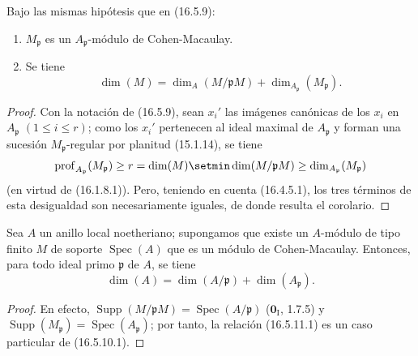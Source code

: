 \begin{corollary}[16.5.10]
\label{0.16.5.10-es}
Bajo las mismas hipótesis que en \textup{(16.5.9)}:
\begin{enumerate}
  \item[\textup{(i)}] $M_{\mathfrak{p}}$ es un $A_{\mathfrak{p}}$-módulo de
  Cohen-Macaulay.
  \item[\textup{(ii)}] Se tiene
  \begin{equation}
  \label{0.16.5.10.1-es}
  \tag{16.5.10.1}
    \dim(M)=\dim_A(M/\mathfrak{p}M)
    +\dim_{A_{\mathfrak{p}}}(M_{\mathfrak{p}}).
  \end{equation}
\end{enumerate}
\end{corollary}

\begin{proof}
Con la notación de (16.5.9), sean $x_i'$ las imágenes canónicas de los $x_i$
en $A_{\mathfrak{p}}$ $(1\leq i\leq r)$; como los $x_i'$ pertenecen al
ideal maximal de $A_{\mathfrak{p}}$ y forman una sucesión
$M_{\mathfrak{p}}$-regular por planitud (15.1.14), se tiene
\[
  \operatorname{prof}_{A_{\mathfrak{p}}}(M_{\mathfrak{p}})
  \geq r=\dim(M)\setmin\dim(M/\mathfrak{p}M)
  \geq\dim_{A_{\mathfrak{p}}}(M_{\mathfrak{p}})
\]
(en virtud de (16.1.8.1)). Pero, teniendo en cuenta (16.4.5.1), los tres
términos de esta desigualdad son necesariamente iguales, de donde resulta el corolario.
\end{proof}


\begin{corollary}[16.5.11]
\label{0.16.5.11-es}
Sea $A$ un anillo local noetheriano; supongamos que existe un $A$-módulo de
tipo finito $M$ de soporte $\operatorname{Spec}(A)$ que es un módulo de
Cohen-Macaulay. Entonces, para todo ideal primo $\mathfrak{p}$ de $A$, se tiene
\begin{equation}
\label{0.16.5.11.1-es}
\tag{16.5.11.1}
  \dim(A)=\dim(A/\mathfrak{p})+\dim(A_{\mathfrak{p}}).
\end{equation}
\end{corollary}

\begin{proof}
En efecto, $\operatorname{Supp}(M/\mathfrak{p}M)
=\operatorname{Spec}(A/\mathfrak{p})$ ($\mathbf{0}_{\mathrm I}$, 1.7.5) y
$\operatorname{Supp}(M_{\mathfrak{p}})
=\operatorname{Spec}(A_{\mathfrak{p}})$; por tanto, la relación (16.5.11.1) es un
caso particular de (16.5.10.1).
\end{proof}

